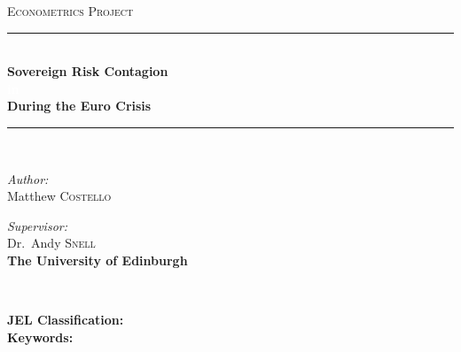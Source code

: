 \documentclass[/../base.tex]{subfiles}
\begin{document}
\begin{center}
\textsc{\Large Econometrics Project}\\[0.5cm]
\rule{1\textwidth}{2pt}\\
{ \LARGE \bfseries Sovereign Risk Contagion \\ \textcolor{white}{in} \\ During the Euro Crisis \\[0.4cm] }
\rule{1\textwidth}{2pt}\\[2cm]

\noindent
\begin{minipage}[t]{0.45\textwidth}
\begin{flushleft} \large
\emph{Author:}\\
Matthew \textsc{Costello}\\
\textbf{}
\end{flushleft}
\end{minipage}%
\begin{minipage}[t]{0.4\textwidth}
\begin{flushright} \large
\emph{Supervisor:} \\
Dr.~Andy \textsc{Snell}\\
\textbf{The University of Edinburgh}

\end{flushright}
\end{minipage}\\

\vfill


    \begin{abstract}
 
    \end{abstract}

\end{center}
\vfill

\noindent
\textbf{JEL Classification:}  \\
\textbf{Keywords:} 
\end{document}
